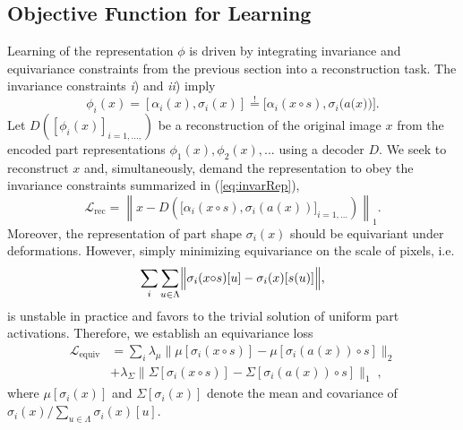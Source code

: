 \subsection{Objective Function for Learning}
    Learning of the representation $\phi$ is driven by integrating invariance and equivariance constraints from the previous section into a reconstruction task.
    The invariance constraints \emph{i}) and \emph{ii}) imply
     \begin{equation}
    \phi_i(x) = [\alpha_i(x), \sigma_i(x)] \overset{!}{=}
    [\alpha_i(x {{\circ}}s), \sigma_i(a({x))]}.
    \label{eq:invarRep}
    \end{equation}
    Let $D([\phi_i(x)]_{i = 1, \dotsc,})$ be a reconstruction of the original image $x$ from the encoded part representations $\phi_1(x), \phi_2(x), ...$ using a decoder $D$. We seek to reconstruct $x$ and, simultaneously, demand the representation to obey the invariance constraints summarized in (\ref{eq:invarRep}),
    \begin{equation}
        \mathcal{L}_\text{rec} =
         \left\lVert x- D\left(\bigl[\alpha_i(x  {{\circ}}s), \sigma_i(a(x))\bigr]_{i = 1,\dotsc}\right)\right\rVert_1
        \label{eq:l_rec}
        .
    \end{equation}
    Moreover, the representation of part shape $\sigma_i(x)$ should be equivariant under deformations. However, simply minimizing equivariance on the scale of pixels, i.e.
    \begin{equation}
     \sum_i \sum_{u \in \Lambda} \Bigl\lVert \sigma_i(x {{\circ}}s)[u]- \sigma_i(x)[s(u)]\Bigr\rVert
     \label{eq:pixeleq}
	    ,
    \end{equation}
    is unstable in practice and favors to the trivial solution of uniform part activations.
    Therefore, we establish an equivariance loss %
    \begin{equation}
    \begin{split}
    \mathcal{L}_{\textrm{equiv}} &= \sum_i \lambda_{\mu} \lVert  \mu[\sigma_i(x{{\circ}}s)]  - \mu[\sigma_i(a(x)) {{\circ}}s]\rVert_{2}  \\ &+ \lambda_{\Sigma} \lVert \Sigma[\sigma_i(x{{\circ}}s)] -  \Sigma[\sigma_i(a(x)) {{\circ}}s] \rVert_{1} \;,
    \end{split}
    \label{eq:equiv}
    \end{equation}
    where $\mu[\sigma_i(x)]$ and $\Sigma[\sigma_i(x)]$ denote the mean and covariance of
    $\sigma_i(x)/ \sum_{u \in \Lambda} \sigma_i(x)[u]$.
